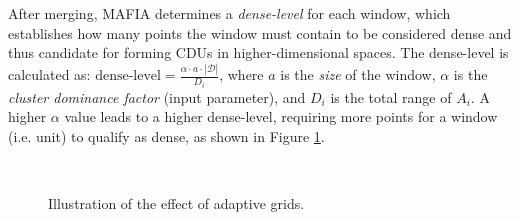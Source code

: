 After merging, MAFIA determines a \textit{dense-level} for each window, which establishes how many points the window must contain to be considered dense and thus candidate for forming CDUs in higher-dimensional spaces. The dense-level is calculated as: $\text{dense-level} = \frac{\alpha \cdot a\cdot |\mathcal{D}|}{D_i}$, where $a$ is the \textit{size} of the window, $\alpha$ is the \textit{cluster dominance factor} (input parameter), and $D_i$ is the total range of $A_i$. A higher $\alpha$ value leads to a higher dense-level, requiring more points for a window (i.e. unit) to qualify as dense, as shown in Figure \ref{fig:adaptive_grids}.
\begin{figure}[H]
    \vspace*{-0.7cm}
    \hspace*{-0.5cm}
    \centering
    ~
    ~
    ~
    ~
    \caption{Illustration of the effect of adaptive grids.}
    \label{fig:adaptive_grids}
    \vspace*{-0.7cm}
\end{figure}

